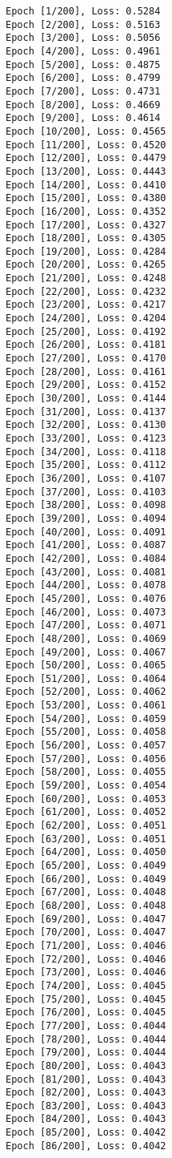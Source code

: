 \documentclass[11pt]{article}
\begin{document}
    \begin{Verbatim}[commandchars=\\\{\}]
Epoch [1/200], Loss: 0.5284
Epoch [2/200], Loss: 0.5163
Epoch [3/200], Loss: 0.5056
Epoch [4/200], Loss: 0.4961
Epoch [5/200], Loss: 0.4875
Epoch [6/200], Loss: 0.4799
Epoch [7/200], Loss: 0.4731
Epoch [8/200], Loss: 0.4669
Epoch [9/200], Loss: 0.4614
Epoch [10/200], Loss: 0.4565
Epoch [11/200], Loss: 0.4520
Epoch [12/200], Loss: 0.4479
Epoch [13/200], Loss: 0.4443
Epoch [14/200], Loss: 0.4410
Epoch [15/200], Loss: 0.4380
Epoch [16/200], Loss: 0.4352
Epoch [17/200], Loss: 0.4327
Epoch [18/200], Loss: 0.4305
Epoch [19/200], Loss: 0.4284
Epoch [20/200], Loss: 0.4265
Epoch [21/200], Loss: 0.4248
Epoch [22/200], Loss: 0.4232
Epoch [23/200], Loss: 0.4217
Epoch [24/200], Loss: 0.4204
Epoch [25/200], Loss: 0.4192
Epoch [26/200], Loss: 0.4181
Epoch [27/200], Loss: 0.4170
Epoch [28/200], Loss: 0.4161
Epoch [29/200], Loss: 0.4152
Epoch [30/200], Loss: 0.4144
Epoch [31/200], Loss: 0.4137
Epoch [32/200], Loss: 0.4130
Epoch [33/200], Loss: 0.4123
Epoch [34/200], Loss: 0.4118
Epoch [35/200], Loss: 0.4112
Epoch [36/200], Loss: 0.4107
Epoch [37/200], Loss: 0.4103
Epoch [38/200], Loss: 0.4098
Epoch [39/200], Loss: 0.4094
Epoch [40/200], Loss: 0.4091
Epoch [41/200], Loss: 0.4087
Epoch [42/200], Loss: 0.4084
Epoch [43/200], Loss: 0.4081
Epoch [44/200], Loss: 0.4078
Epoch [45/200], Loss: 0.4076
Epoch [46/200], Loss: 0.4073
Epoch [47/200], Loss: 0.4071
Epoch [48/200], Loss: 0.4069
Epoch [49/200], Loss: 0.4067
Epoch [50/200], Loss: 0.4065
Epoch [51/200], Loss: 0.4064
Epoch [52/200], Loss: 0.4062
Epoch [53/200], Loss: 0.4061
Epoch [54/200], Loss: 0.4059
Epoch [55/200], Loss: 0.4058
Epoch [56/200], Loss: 0.4057
Epoch [57/200], Loss: 0.4056
Epoch [58/200], Loss: 0.4055
Epoch [59/200], Loss: 0.4054
Epoch [60/200], Loss: 0.4053
Epoch [61/200], Loss: 0.4052
Epoch [62/200], Loss: 0.4051
Epoch [63/200], Loss: 0.4051
Epoch [64/200], Loss: 0.4050
Epoch [65/200], Loss: 0.4049
Epoch [66/200], Loss: 0.4049
Epoch [67/200], Loss: 0.4048
Epoch [68/200], Loss: 0.4048
Epoch [69/200], Loss: 0.4047
Epoch [70/200], Loss: 0.4047
Epoch [71/200], Loss: 0.4046
Epoch [72/200], Loss: 0.4046
Epoch [73/200], Loss: 0.4046
Epoch [74/200], Loss: 0.4045
Epoch [75/200], Loss: 0.4045
Epoch [76/200], Loss: 0.4045
Epoch [77/200], Loss: 0.4044
Epoch [78/200], Loss: 0.4044
Epoch [79/200], Loss: 0.4044
Epoch [80/200], Loss: 0.4043
Epoch [81/200], Loss: 0.4043
Epoch [82/200], Loss: 0.4043
Epoch [83/200], Loss: 0.4043
Epoch [84/200], Loss: 0.4043
Epoch [85/200], Loss: 0.4042
Epoch [86/200], Loss: 0.4042

\end{Verbatim}
\end{document}
